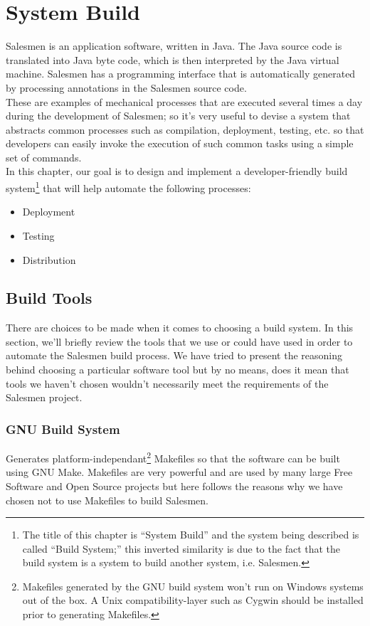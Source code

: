 \chapter{System Build}\label{BuildSystem}

Salesmen is an application software, written in Java. The Java source code
is translated into Java byte code, which is then interpreted by the Java
virtual machine. Salesmen has a programming interface that is automatically
generated by processing annotations in the Salesmen source code. \\

These are examples of mechanical processes that are executed several times 
a day during the development of Salesmen; so it's very useful to devise a 
system that abstracts common processes such as compilation, deployment, 
testing, etc. so that developers can easily invoke the execution of
such common tasks using a simple set of commands.\\

In this chapter, our goal is to design and implement a 
developer-friendly build system\footnote{The title of this chapter is 
``System Build'' and the system being described is called 
``Build System;'' this inverted similarity is due to the fact that the 
build system is a system to build another system, i.e. Salesmen.}
that will help automate the following processes:

\begin{itemize}
\item
Deployment
\item
Testing
\item
Distribution
\end{itemize}
\newpage

\section{Build Tools}\label{BuildSystemTools}

There are choices to be made when it comes to choosing a build system. 
In this section, we'll briefly review the tools that we use or could have
used in order to automate the Salesmen build process. We have tried to 
present the reasoning behind choosing a particular software tool but
by no means, does it mean that tools we haven't chosen wouldn't
necessarily meet the requirements of the Salesmen project.

\subsection{GNU Build System}\label{BuildSystemToolsGNUBuildSystem}
Generates platform-independant\footnote{Makefiles generated by the GNU 
build system won't run on Windows systems out of the box. A Unix
compatibility-layer such as Cygwin should be installed prior to
generating Makefiles.}
Makefiles so that the software can be built using GNU Make.
Makefiles are very powerful and are used by many large Free Software and
Open Source projects but here follows the reasons why we have chosen
not to use Makefiles to build Salesmen.

